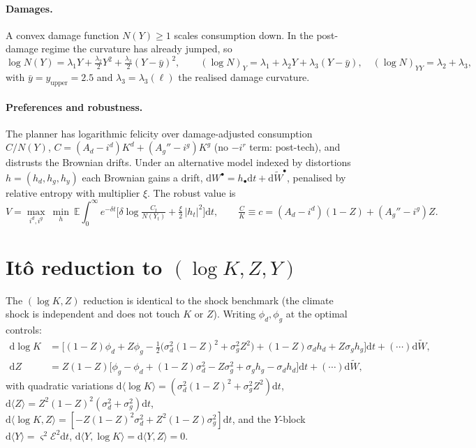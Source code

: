 \documentclass[11pt]{article}
\newcommand{\dd}{\mathrm{d}}
\newcommand{\E}{\mathcal E}
\begin{document}
\paragraph{Damages.} A convex damage function $N(Y)\ge1$ scales consumption down. In the
post-damage regime the curvature has already jumped, so
\[
\log N(Y)=\lambda_1 Y+\tfrac{\lambda_2}{2}Y^2+\tfrac{\lambda_3}{2}(Y-\bar y)^2,
\qquad
(\log N)_Y=\lambda_1+\lambda_2 Y+\lambda_3(Y-\bar y),\quad (\log N)_{YY}=\lambda_2+\lambda_3,
\]
with $\bar y=y_{\text{upper}}=2.5$ and $\lambda_3=\lambda_3(\ell)$ the realised damage curvature.

\paragraph{Preferences and robustness.} The planner has logarithmic felicity over
damage-adjusted consumption $C/N(Y)$, $C=(A_d-i^d)K^d+(A_g''-i^g)K^g$ (no $-i^r$ term: post-tech),
and distrusts the Brownian drifts. Under an alternative model indexed by distortions
$h=(h_d,h_g,h_y)$ each Brownian gains a drift, $\dd W^\bullet=h_\bullet\dd t+\dd\widetilde W^\bullet$,
penalised by relative entropy with multiplier $\xi$. The robust value is
\[
V=\max_{i^d,i^g}\ \min_{h}\ \mathbb E\!\int_0^\infty e^{-\delta t}
\Big[\delta\log\tfrac{C_t}{N(Y_t)}+\tfrac{\xi}{2}\,|h_t|^2\Big]\dd t,
\qquad \tfrac{C}{K}\equiv c=(A_d-i^d)(1-Z)+(A_g''-i^g)Z.
\]

\section{It\^o reduction to $(\log K,Z,Y)$}

The $(\log K,Z)$ reduction is identical to the shock benchmark (the climate shock is
independent and does not touch $K$ or $Z$). Writing $\phi_d,\phi_g$ at the optimal controls:
\begin{align*}
\dd\log K&=\Big[(1-Z)\phi_d+Z\phi_g-\tfrac12\big(\sigma_d^2(1-Z)^2+\sigma_g^2Z^2\big)
+(1-Z)\sigma_d h_d+Z\sigma_g h_g\Big]\dd t+(\cdots)\dd\widetilde W,\\
\dd Z&=Z(1-Z)\Big[\phi_g-\phi_d+(1-Z)\sigma_d^2-Z\sigma_g^2
+\sigma_g h_g-\sigma_d h_d\Big]\dd t+(\cdots)\dd\widetilde W,
\end{align*}
with quadratic variations $\dd\langle\log K\rangle=(\sigma_d^2(1-Z)^2+\sigma_g^2Z^2)\dd t$,
$\dd\langle Z\rangle=Z^2(1-Z)^2(\sigma_d^2+\sigma_g^2)\dd t$,
$\dd\langle\log K,Z\rangle=[-Z(1-Z)^2\sigma_d^2+Z^2(1-Z)\sigma_g^2]\dd t$, and the $Y$-block
$\dd\langle Y\rangle=\varsigma^2\E^2\dd t$, $\dd\langle Y,\log K\rangle=\dd\langle Y,Z\rangle=0$.
\end{document}
